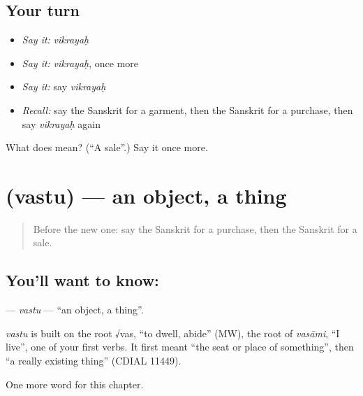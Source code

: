 \subsection*{Your turn}
\begin{itemize}
\raggedright
  \item \emph{Say it:} \emph{vikrayaḥ}
  \item \emph{Say it:} \emph{vikrayaḥ}, once more
  \item \emph{Say it:} say \emph{vikrayaḥ}
  \item \emph{Recall:} say the Sanskrit for a garment, then the Sanskrit for a purchase, then say \emph{vikrayaḥ} again
\end{itemize}

\begin{tcolorbox}[breakable,colback=teal!4,colframe=teal!35!black,title={Before you move on}]
What does  mean? (\textquotedblleft{}A sale\textquotedblright{}.) Say it once more.
\end{tcolorbox}
\section[\texorpdfstring{\sk{वस्तु} (vastu)}{वस्तु (vastu)}]{ (vastu) — an object, a thing}

\label{lesson:SA-C193-vastu}



\begin{quote}
Before the new one: say the Sanskrit for a purchase, then the Sanskrit for a sale.
\end{quote}

\subsection*{You'll want to know: }
\textbf{} — \emph{vastu} — \textquotedblleft{}an object, a thing\textquotedblright{}.

\begin{cousinweb}
\emph{vastu} is built on the root √vas, \textquotedblleft{}to dwell, abide\textquotedblright{} (MW), the root of \emph{vasāmi}, \textquotedblleft{}I live\textquotedblright{}, one of your first verbs. It first meant \textquotedblleft{}the seat or place of something\textquotedblright{}, then \textquotedblleft{}a really existing thing\textquotedblright{} (CDIAL 11449).
\end{cousinweb}

\begin{grammarlens}[title={What you've built}]
One more word for this chapter.
\end{grammarlens}

